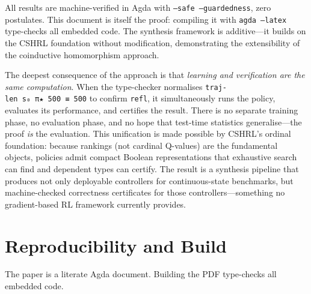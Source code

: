 \documentclass[9pt,a4paper]{article}
\theoremstyle{plain}
\theoremstyle{definition}
\theoremstyle{remark}
\begin{document}
All results are machine-verified in Agda with \texttt{--safe --guardedness}, zero postulates.  This document is itself the proof: compiling it with \texttt{agda --latex} type-checks all embedded code.  The synthesis framework is additive---it builds on the CSHRL foundation without modification, demonstrating the extensibility of the coinductive homomorphism approach.

The deepest consequence of the approach is that \emph{learning and verification are the same computation}.  When the type-checker normalises \texttt{traj-len~s₀~π★~500~≡~500} to confirm \texttt{refl}, it simultaneously runs the policy, evaluates its performance, and certifies the result.  There is no separate training phase, no evaluation phase, and no hope that test-time statistics generalise---the proof \emph{is} the evaluation.  This unification is made possible by CSHRL's ordinal foundation: because rankings (not cardinal Q-values) are the fundamental objects, policies admit compact Boolean representations that exhaustive search can find and dependent types can certify.  The result is a synthesis pipeline that produces not only deployable controllers for continuous-state benchmarks, but machine-checked correctness certificates for those controllers---something no gradient-based RL framework currently provides.


\section{Reproducibility and Build}

The paper is a literate Agda document.  Building the PDF type-checks all embedded code.
\end{document}
